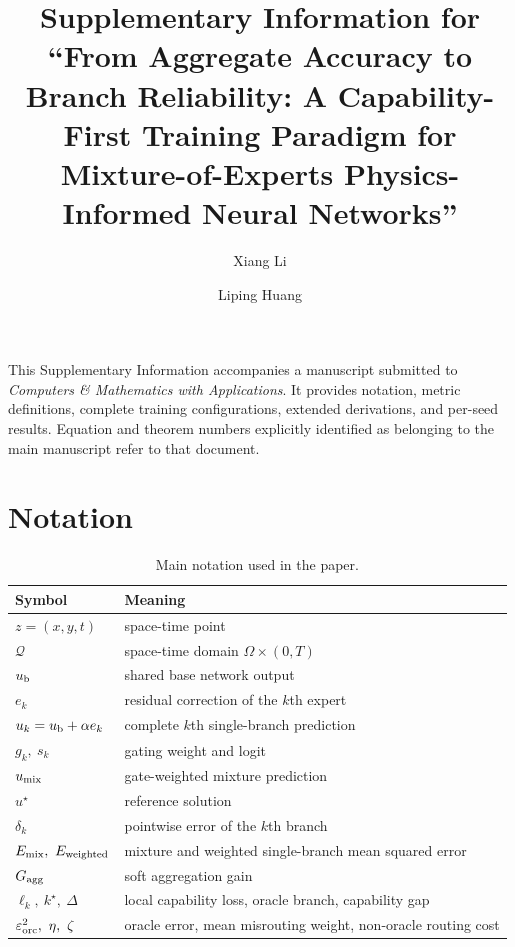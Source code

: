 \documentclass[preprint,12pt]{elsarticle}
\begin{document}
\begin{frontmatter}
\title{Supplementary Information for ``From Aggregate Accuracy to Branch Reliability: A Capability-First Training Paradigm for Mixture-of-Experts Physics-Informed Neural Networks''}
\author[1]{Xiang Li}
\author[1]{Liping Huang}
\address[1]{Henan University of Economics and Law, Zhengzhou, China}
\end{frontmatter}

\noindent This Supplementary Information accompanies a manuscript submitted to \emph{Computers \& Mathematics with Applications}. It provides notation, metric definitions, complete training configurations, extended derivations, and per-seed results. Equation and theorem numbers explicitly identified as belonging to the main manuscript refer to that document.

\appendix
\section{Notation}
\label{app:notation}

\begin{table}[H]
\centering\small
\caption{Main notation used in the paper.}
\begin{tabular}{ll}
\toprule
Symbol & Meaning\\
\midrule
$z=(x,y,t)$ & space-time point\\
$\mathcal Q$ & space-time domain $\Omega\times(0,T)$\\
$u_{\rm b}$ & shared base network output\\
$e_k$ & residual correction of the $k$th expert\\
$u_k=u_{\rm b}+\alpha e_k$ & complete $k$th single-branch prediction\\
$g_k,\ s_k$ & gating weight and logit\\
$u_{\rm mix}$ & gate-weighted mixture prediction\\
$u^\star$ & reference solution\\
$\delta_k$ & pointwise error of the $k$th branch\\
$E_{\rm mix},\ E_{\rm weighted}$ & mixture and weighted single-branch mean squared error\\
$G_{\rm agg}$ & soft aggregation gain\\
$\ell_k,\ k^\star,\ \Delta$ & local capability loss, oracle branch, capability gap\\
$\varepsilon_{\rm orc}^2,\ \eta,\ \zeta$ & oracle error, mean misrouting weight, non-oracle routing cost\\
\bottomrule
\end{tabular}
\end{table}
\end{document}
